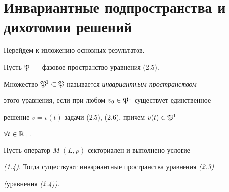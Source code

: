  


\section{Инвариантные подпространства и дихотомии решений} 


 


Перейдем к изложению основных результатов. 


 


\begin{defnm} Пусть $\frak P$ --- фазовое пространство уравнения (2.5). 


Множество $\frak P^1\subset\frak P$ называется {\em инвариантным пространством} 


этого уравнения, если при любом $v_0\in\frak P^1$ существует единственное 


решение $v=v(t)$ задачи (2.5), (2.6), причем $v(t)\in\frak P^1$ 


$\forall t\in\Bbb R_+$. 


\end{defnm} 


 


\begin{thmm} Пусть оператор $M$ $(L,p)$-секториален и выполнено условие 


{\em (1.4)}. Тогда существуют инвариантные пространства уравнения {\em (2.3)}


{\em (}уравнения {\em (2.4)).} 


\end{thmm} 


 


